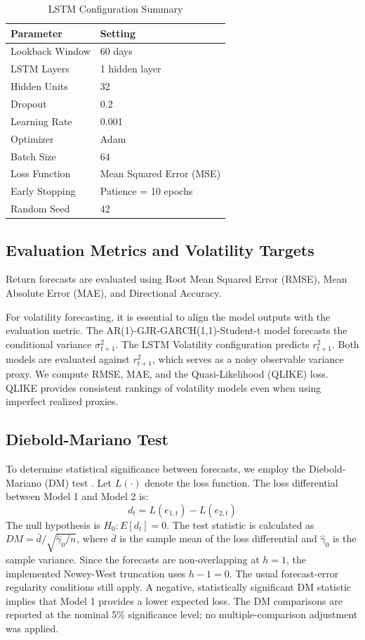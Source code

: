 \documentclass[11pt,a4paper]{article}
\begin{document}
\begin{table}[H]
\centering
\caption{LSTM Configuration Summary}
\label{tab:lstm_config}
\begin{tabular}{ll}
\toprule
Parameter & Setting \\
\midrule
Lookback Window & 60 days \\
LSTM Layers & 1 hidden layer \\
Hidden Units & 32 \\
Dropout & 0.2 \\
Learning Rate & 0.001 \\
Optimizer & Adam \\
Batch Size & 64 \\
Loss Function & Mean Squared Error (MSE) \\
Early Stopping & Patience = 10 epochs \\
Random Seed & 42 \\
\bottomrule
\end{tabular}
\end{table}

\subsection{Evaluation Metrics and Volatility Targets}
Return forecasts are evaluated using Root Mean Squared Error (RMSE), Mean Absolute Error (MAE), and Directional Accuracy. 

For volatility forecasting, it is essential to align the model outputs with the evaluation metric. The AR(1)-GJR-GARCH(1,1)-Student-t model forecasts the conditional variance $\sigma_{t+1}^2$. The LSTM Volatility configuration predicts $r_{t+1}^2$. Both models are evaluated against $r_{t+1}^2$, which serves as a noisy observable variance proxy. We compute RMSE, MAE, and the Quasi-Likelihood (QLIKE) loss. QLIKE provides consistent rankings of volatility models even when using imperfect realized proxies.

\subsection{Diebold-Mariano Test}
To determine statistical significance between forecasts, we employ the Diebold-Mariano (DM) test \cite{diebold1995comparing}. Let $L(\cdot)$ denote the loss function. The loss differential between Model 1 and Model 2 is:
\begin{equation}
d_t = L(e_{1,t}) - L(e_{2,t})
\end{equation}
The null hypothesis is $H_0: E[d_t] = 0$. The test statistic is calculated as $DM = \bar{d} / \sqrt{\hat{\gamma}_0 / n}$, where $\bar{d}$ is the sample mean of the loss differential and $\hat{\gamma}_0$ is the sample variance. Since the forecasts are non-overlapping at $h=1$, the implemented Newey-West truncation uses $h-1=0$. The usual forecast-error regularity conditions still apply. A negative, statistically significant DM statistic implies that Model 1 provides a lower expected loss. The DM comparisons are reported at the nominal 5\% significance level; no multiple-comparison adjustment was applied.
\end{document}
